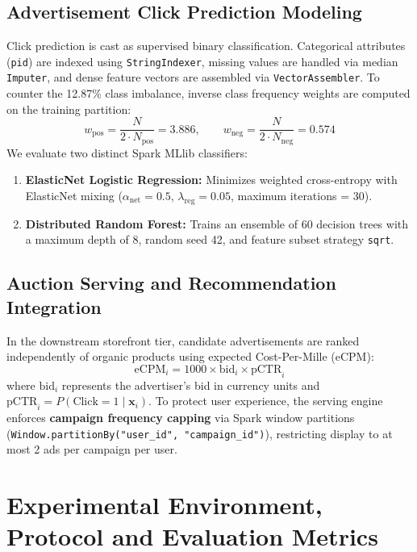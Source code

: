\documentclass[10pt,a4paper,twoside]{article}
\begin{document}
\subsection{Advertisement Click Prediction Modeling}
Click prediction is cast as supervised binary classification. Categorical attributes (\texttt{pid}) are indexed using \texttt{StringIndexer}, missing values are handled via median \texttt{Imputer}, and dense feature vectors are assembled via \texttt{VectorAssembler}. To counter the 12.87\% class imbalance, inverse class frequency weights are computed on the training partition:
\begin{equation}
w_{\text{pos}} = \frac{N}{2 \cdot N_{\text{pos}}} = 3.886, \qquad w_{\text{neg}} = \frac{N}{2 \cdot N_{\text{neg}}} = 0.574
\end{equation}
We evaluate two distinct Spark MLlib classifiers:
\begin{enumerate}
    \item \textbf{ElasticNet Logistic Regression:} Minimizes weighted cross-entropy with ElasticNet mixing ($\alpha_{\text{net}} = 0.5$, $\lambda_{\text{reg}} = 0.05$, maximum iterations = 30).
    \item \textbf{Distributed Random Forest:} Trains an ensemble of 60 decision trees with a maximum depth of 8, random seed 42, and feature subset strategy \texttt{sqrt}.
\end{enumerate}

\subsection{Auction Serving and Recommendation Integration}
In the downstream storefront tier, candidate advertisements are ranked independently of organic products using expected Cost-Per-Mille (eCPM):
\begin{equation}
\text{eCPM}_i = 1000 \times \text{bid}_i \times \text{pCTR}_i
\end{equation}
where $\text{bid}_i$ represents the advertiser's bid in currency units and $\text{pCTR}_i = P(\text{Click} = 1 \mid \mathbf{x}_i)$. To protect user experience, the serving engine enforces \textbf{campaign frequency capping} via Spark window partitions (\texttt{Window.partitionBy("user\_id", "campaign\_id")}), restricting display to at most 2 ads per campaign per user.

\section{Experimental Environment, Protocol and Evaluation Metrics}
\end{document}
